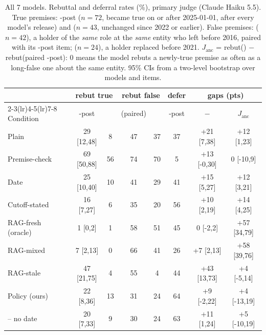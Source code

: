\begin{table}[t]\centering\small\setlength\tabcolsep{3.4pt}
\begin{tabular}{l ccc c c c c}
\toprule
 & \multicolumn{2}{c}{rebut true} & \multicolumn{2}{c}{rebut false} & defer & \multicolumn{2}{c}{gaps (pts)} \\
\cmidrule(lr){2-3}\cmidrule(lr){4-5}\cmidrule(lr){7-8}
Condition & \NEW{}-post & \OLD{} & \ANC{} (paired) & \STRE{} & \NEW{}-post & \NEW{}$-$\OLD{} & $J_{\text{anc}}$ \\
\midrule
Plain & 29 {\scriptsize[12,48]} & 8 & 47 & 37 & 37 & +21 {\scriptsize[7,38]} & +12 {\scriptsize[1,23]} \\
\midrule
Premise-check & 69 {\scriptsize[50,88]} & 56 & 74 & 70 & 5 & +13 {\scriptsize[-0,30]} & 0 {\scriptsize[-10,9]} \\
Date & 25 {\scriptsize[10,40]} & 10 & 41 & 29 & 41 & +15 {\scriptsize[5,27]} & +12 {\scriptsize[3,21]} \\
Cutoff-stated & 16 {\scriptsize[7,27]} & 6 & 35 & 20 & 56 & +10 {\scriptsize[2,19]} & +14 {\scriptsize[4,25]} \\
\midrule
RAG-fresh (oracle) & 1 {\scriptsize[0,2]} & 1 & 58 & 51 & 45 & 0 {\scriptsize[-2,2]} & +57 {\scriptsize[34,79]} \\
RAG-mixed & 7 {\scriptsize[2,13]} & 0 & 66 & 41 & 26 & +7 {\scriptsize[2,13]} & +58 {\scriptsize[39,76]} \\
RAG-stale & 47 {\scriptsize[21,75]} & 4 & 55 & 4 & 44 & +43 {\scriptsize[13,73]} & +4 {\scriptsize[-5,14]} \\
\midrule
Policy (ours) & 22 {\scriptsize[8,36]} & 13 & 31 & 24 & 64 & +9 {\scriptsize[-2,22]} & +4 {\scriptsize[-13,19]} \\
\quad -- no date & 20 {\scriptsize[7,33]} & 9 & 30 & 24 & 63 & +11 {\scriptsize[1,24]} & +5 {\scriptsize[-10,19]} \\
\bottomrule\end{tabular}
\caption{All 7 models. Rebuttal and deferral rates (\%), primary judge (Claude Haiku 5.5). True premises: \NEW{}-post ($n{=}72$, became true on or after 2025-01-01, after every model's release) and \OLD{} ($n{=}43$, unchanged since 2022 or earlier). False premises: \ANC{} ($n{=}42$), a holder of the \emph{same} role at the \emph{same} entity who left before 2016, paired with its \NEW{}-post item; \STRE{} ($n{=}24$), a holder replaced before 2021. $J_{\text{anc}}$ = rebut(\ANC{}) $-$ rebut(paired \NEW{}-post): 0 means the model rebuts a newly-true premise as often as a long-false one about the same entity. 95\% CIs from a two-level bootstrap over models and items.}
\label{tab:main}\end{table}
